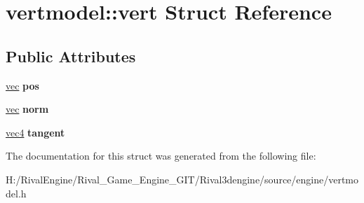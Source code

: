 \hypertarget{structvertmodel_1_1vert}{}\section{vertmodel\+:\+:vert Struct Reference}
\label{structvertmodel_1_1vert}
\subsection*{Public Attributes}
\begin{DoxyCompactItemize}
\item 
\mbox{\label{structvertmodel_1_1vert_ab1b8310da8322bb6a3d3fff0a27cf260}} 
\hyperlink{structvec}{vec} {\bfseries pos}
\item 
\mbox{\label{structvertmodel_1_1vert_a6c8c8cf9feeb4fb6774e932c2ebe9b38}} 
\hyperlink{structvec}{vec} {\bfseries norm}
\item 
\mbox{\label{structvertmodel_1_1vert_aecb79bd6b3be102c1b0b5cf60f0075c9}} 
\hyperlink{structvec4}{vec4} {\bfseries tangent}
\end{DoxyCompactItemize}


The documentation for this struct was generated from the following file\+:\begin{DoxyCompactItemize}
\item 
H\+:/\+Rival\+Engine/\+Rival\+\_\+\+Game\+\_\+\+Engine\+\_\+\+G\+I\+T/\+Rival3dengine/source/engine/vertmodel.\+h\end{DoxyCompactItemize}
